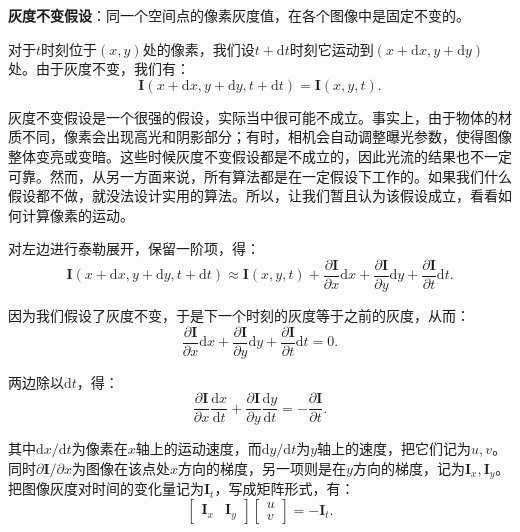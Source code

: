 \textbf{灰度不变假设}：同一个空间点的像素灰度值，在各个图像中是固定不变的。

对于$t$时刻位于$(x,y)$处的像素，我们设$t+\mathrm{d}t$时刻它运动到$(x+\mathrm{d}x, y+\mathrm{d}y)$处。由于灰度不变，我们有：
\begin{equation} 
\bm{I}(x+\mathrm{d}x, y+\mathrm{d}y, t+\mathrm{d}t) = \bm{I} (x,y,t).
\end{equation}

灰度不变假设是一个很强的假设，实际当中很可能不成立。事实上，由于物体的材质不同，像素会出现高光和阴影部分；有时，相机会自动调整曝光参数，使得图像整体变亮或变暗。这些时候灰度不变假设都是不成立的，因此光流的结果也不一定可靠。然而，从另一方面来说，所有算法都是在一定假设下工作的。如果我们什么假设都不做，就没法设计实用的算法。所以，让我们暂且认为该假设成立，看看如何计算像素的运动。

对左边进行泰勒展开，保留一阶项，得：
\begin{equation}
\bm{I} \left( {x + \mathrm{d}x,y + \mathrm{d}y,t + \mathrm{d}t} \right) \approx \bm{I} \left( {x,y,t} \right) + \frac{{\partial \bm{I} }}{{\partial x}}\mathrm{d}x + \frac{{\partial \bm{I}}}{{\partial y}}\mathrm{d}y + \frac{{\partial \bm{I}}}{{\partial t}}\mathrm{d}t.
\end{equation}

因为我们假设了灰度不变，于是下一个时刻的灰度等于之前的灰度，从而：
\begin{equation}
 \frac{{\partial \bm{I} }}{{\partial x}}\mathrm{d}x + \frac{{\partial \bm{I}}}{{\partial y}}\mathrm{d}y + \frac{{\partial \bm{I}}}{{\partial t}}\mathrm{d}t = 0.
\end{equation}

两边除以$\mathrm{d}t$，得：
\begin{equation}\label{key}
 \frac{{\partial \bm{I} }}{{\partial x}} \frac{\mathrm{d}x}{\mathrm{d}t} + \frac{{\partial \bm{I}}}{{\partial y}} \frac{\mathrm{d}y}{\mathrm{d}t} =- \frac{{\partial \bm{I}}}{{\partial t}}.
\end{equation}

其中$\mathrm{d}x / \mathrm{d}t$为像素在$x$轴上的运动速度，而$\mathrm{d}y/\mathrm{d}t$为$y$轴上的速度，把它们记为$u,v$。同时$\partial \bm{I}/{\partial x}$为图像在该点处$x$方向的梯度，另一项则是在$y$方向的梯度，记为$\bm{I}_x, \bm{I}_y$。把图像灰度对时间的变化量记为$\bm{I}_t$，写成矩阵形式，有：
\begin{equation}
\left[ {\begin{array}{*{20}{c}}
	{{ \bm{I}_x}}&{{ \bm{I}_y}}
	\end{array}} \right]\left[ \begin{array}{l}
u\\
v
\end{array} \right] =  - {\bm{I}_t}.
\end{equation}

